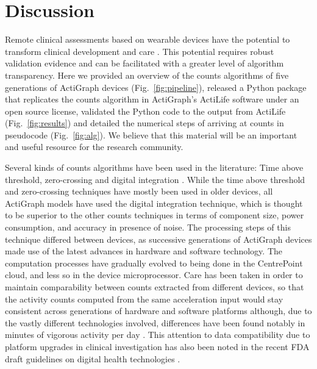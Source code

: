 \documentclass{bmcart}
\begin{document}
\section*{Discussion}
Remote clinical assessments based on wearable devices have the potential to
transform clinical development and care
\cite{strain_wearable-device-measured_2020}. This potential requires robust
validation evidence and can be facilitated with a greater level of algorithm
transparency. Here we provided an overview of the counts algorithms of five
generations of ActiGraph devices (Fig.~\ref{fig:pipeline}), released a Python
package that replicates the counts algorithm in ActiGraph’s ActiLife software
under an open source license, validated the Python code to the output from
ActiLife (Fig.~\ref{fig:results}) and detailed the numerical steps of arriving
at counts in pseudocode (Fig.~\ref{fig:alg}). We believe that this material
will be an important and useful resource for the research community.

Several kinds of counts algorithms have been used in the literature: Time above
threshold, zero-crossing and digital integration \cite{jul_4_comparing_2001}.
While the time above threshold and zero-crossing techniques have mostly been
used in older devices, all ActiGraph models have used the digital integration
technique, which is thought to be superior to the other counts techniques
\cite{redmond_observations_1985} in terms of component size, power consumption,
and accuracy in presence of noise. The processing steps of this technique
differed between devices, as successive generations of ActiGraph devices made
use of the latest advances in hardware and software technology. The computation
processes have gradually evolved to being done
in the CentrePoint cloud, and less so in the device microprocessor. Care has been
taken in order to maintain comparability between counts extracted from
different devices, so that the activity counts computed from the same
acceleration input would stay consistent across generations of hardware and
software platforms \cite{cain_comparison_2013, feito_evaluation_2012,
	grydeland_comparison_2014} although, due to the vastly different technologies
involved, differences have been found notably in minutes of vigorous activity
per day \cite{whitaker_comparison_2018}. This attention to data compatibility
due to platform upgrades in clinical investigation has also been noted in the
recent FDA draft guidelines on digital health technologies
\cite{research_digital_2021}.
\end{document}
